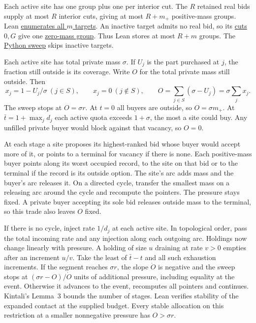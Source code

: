 \documentclass[11pt,letterpaper]{article}
\newcommand{\baseurl}{https://github.com/robbiemu/bayesian-simple-security-games/blob/75bc25c2ddfac1813064434a3165b3ddd1a1f63d}
\newcommand{\atfile}[2]{\href{\baseurl/#1}{#2}}
\begin{document}
Each active site has one group plus one per interior cut. The $R$ retained real
bids supply at most $R$ interior cuts, giving at most $R+m_+$ positive-mass groups.
Lean \atfile{lean/Kintali/TrialWork/SelectedLists.lean\#L69}{enumerates all $m$ targets}.
An inactive target admits no real bid, so its \atfile{lean/Kintali/RetainedQuotes.lean\#L88}{cuts $0,G$}
give one \atfile{lean/Kintali/QuotaSweep/BuilderParameters.lean\#L24}{zero-mass group}.
Thus Lean stores at most $R+m$ groups. The
\atfile{experiments/kintali_market.py\#L52}{Python sweep} skips inactive targets.

Each active site has total private mass $\sigma$. If $U_j$ is the part
purchased at $j$, the fraction still outside is its coverage. Write $O$
for the total private mass still outside. Then
\begin{equation}
 x_j=1-U_j/\sigma\ (j\in S),\qquad x_j=0\ (j\notin S),\qquad
 O=\sum_{j\in S}(\sigma-U_j)=\sigma\sum_j x_j .
 \label{eq:contact}
\end{equation}
The sweep stops at $O=\sigma r$. At $t=0$ all buyers are outside, so $O=\sigma m_+$.
At $\bar t=1+\max_j d_j$ each active quota exceeds $1+\sigma$, the most a
site could buy. Any unfilled private buyer would block against that vacancy, so $O=0$.

At each stage a site proposes its highest-ranked bid whose buyer would
accept more of it, or points to a terminal for vacancy if there is none. Each positive-mass
buyer points along its worst occupied record, to the site on that bid or
to the terminal if the record is its outside option.
The site's arc adds mass and the buyer's arc releases it.
On a directed cycle, transfer the smallest mass on a releasing arc around
the cycle and recompute the pointers. The pressure stays fixed. A private
buyer accepting its sole bid releases outside mass to the terminal, so
this trade also leaves $O$ fixed.

If there is no cycle, inject rate $1/d_j$ at each active site. In
topological order, pass the total incoming rate and any injection along
each outgoing arc. Holdings now change linearly with pressure. A holding
of size $u$ draining at rate $v>0$ empties after an increment $u/v$.
Take the least of $\bar t-t$ and all such exhaustion increments. If the
segment reaches $\sigma r$, the slope $\dot O$ is negative and the sweep
stops at $(\sigma r-O)/\dot O$ units of additional pressure, including
equality at the event. Otherwise it advances to the event, recomputes all
pointers and continues. Kintali's Lemma~3 bounds the number of stages.
Lean verifies stability of the expanded contact at the supplied budget.
Every stable allocation on this restriction at a smaller nonnegative
pressure has $O>\sigma r$. \cite[Lemma~3]{kintali}
\end{document}
